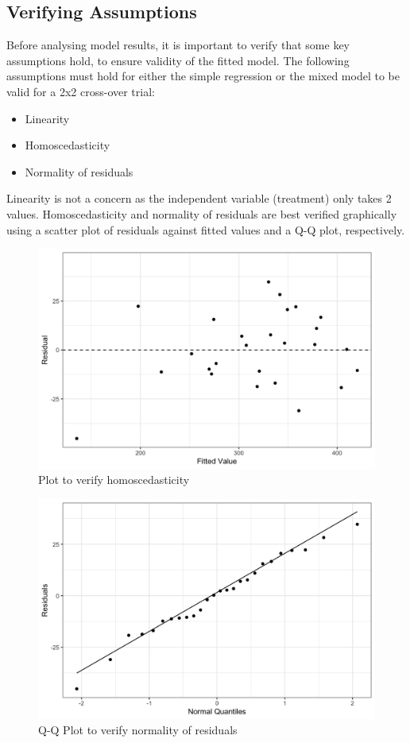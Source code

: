 \documentclass[12pt, TexShade, letterpaper]{report}
\begin{document}
\subsection{Verifying Assumptions}\label{verifying-assumptions-subsection}
Before analysing model results, it is important to verify that some key assumptions hold, to ensure validity of the fitted model. The following assumptions must hold for either the simple regression or the mixed model to be valid for a 2x2 cross-over trial:
\begin{itemize}
    \item Linearity
    \item Homoscedasticity
    \item Normality of residuals
\end{itemize}
Linearity is not a concern as the independent variable (treatment) only takes 2 values. Homoscedasticity and normality of residuals are best verified graphically using a scatter plot of residuals against fitted values and a Q-Q plot, respectively.
\begin{figure}[ht]
    \centering
    \includegraphics[width=0.85\linewidth]{report/figures/homoscedasticityPlot.png}
    \caption{Plot to verify homoscedasticity}
    \label{fig:homoscedasticity}
\end{figure}
\begin{figure}[ht]
    \centering
    \includegraphics[width=0.85\linewidth]{report/figures/qqplot.png}
    \caption{Q-Q Plot to verify normality of residuals}
    \label{fig:qqplot}
\end{figure}
\end{document}
